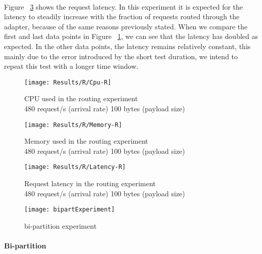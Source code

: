 \paragraph{}

Figure ~\ref{fig:routLatency} shows the request latency.
In this experiment it is expected for the latency to steadily increase with the fraction of requests routed through the adapter, because of the same reasons previously stated.
When we compare the first and last data points in Figure ~\ref{fig:routCpu}, we can see that the latency has doubled as expected.
In the other data points, the latency remains relatively constant, this mainly due to the error introduced by the short test duration, we intend to repeat this test with a longer time window.



\begin{figure}[htbp]
    \centering
    \texttt{[image: Results/R/Cpu-R]}
    \caption{CPU used in the routing experiment \\\hspace{\textwidth} 480 request/s (arrival rate) 100 bytes (payload size)}
    \label{fig:routCpu}
\end{figure}

\begin{figure}[htbp]
    \centering
    \texttt{[image: Results/R/Memory-R]}
    \caption{Memory used in the routing experiment \\\hspace{\textwidth} 480 request/s (arrival rate) 100 bytes (payload size)}
    \label{fig:routMem}
\end{figure}

\begin{figure}[htbp]
    \centering
    \texttt{[image: Results/R/Latency-R]}
    \caption{Request latency in the routing experiment \\\hspace{\textwidth} 480 request/s (arrival rate) 100 bytes (payload size)}
    \label{fig:routLatency}
\end{figure}

\newpage

\begin{figure}[htbp]
    \centering
    \texttt{[image: bipartExperiment]}
    \caption{bi-partition experiment}
    \label{fig:biPart}
\end{figure}

\paragraph{Bi-partition}

